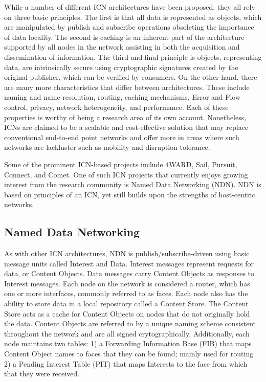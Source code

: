 \documentclass[a4paper,12pt]{report}      %
\begin{document}
While a number of different ICN architectures have been proposed, they all rely on three basic
principles. The first is that all data is represented as objects, which are manipulated by publish and
subscribe operations obsoleting the importance of data locality. The second is caching is an inherent
part of the architecture supported by all nodes in the network assisting in both the acquisition and
dissemination of information. The third and final principle is objects, representing data, are intrinsically
secure using cryptographic signatures created by the original publisher, which can be verified
by consumers. On the other hand, there are many more characteristics that differ between architectures.
These include naming and name resolution, routing, caching mechanisms, Error and Flow control,
privacy, network heterogeneity, and performance. Each of these properties is worthy of being a research
area of its own account\cite{hotnets}. Nonetheless, ICNs are claimed to be a scalable and
cost-effective solution that may replace conventional end-to-end point networks and offer more in areas 
where such networks are lackluster such as mobility and disruption tolerance.

Some of the prominent ICN-based projects include 4WARD, Sail, Pursuit, Connect, and Comet\cite{bond}. 
One of such ICN projects that currently enjoys growing interest from the research
community is Named Data Networking (NDN). NDN is based on principles of an ICN, yet still builds
upon the strengths of host-centric networks\cite{ndnproj}. 

\subsection{Named Data Networking}
As with other ICN architectures, NDN is publish/subscribe-driven using basic message units called
Interest and Data. Interest messages represent requests for data, or Content Objects. 
Data messages carry Content Objects as responses to Interest messages. 
Each node on the network is considered a router, which has one or more interfaces,
commonly referred to as faces. Each node also has the ability to store data in a
 local repository called a Content Store. The Content Store acts as a cache for Content Objects on nodes 
that do not originally hold the data. Content Objects are referred to by a unique naming scheme consistent throughout the network and are all
signed crytographically. Additionally, each node maintains two tables: 1) a Forwarding Information Base
(FIB) that maps Content Object names to faces that they can be found; mainly used for routing 2) a
Pending Interest Table (PIT) that maps Interests to the face from which that they were received.
\end{document}
